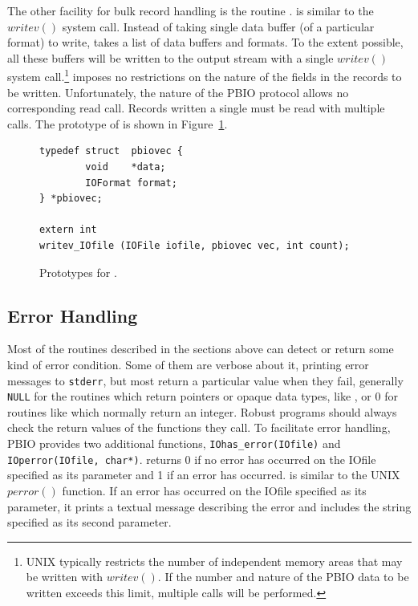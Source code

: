 The other facility for bulk record handling is the routine .
 is similar to the $writev()$ system call.  Instead of taking
single data buffer (of a particular format) to write,  takes
a list of data buffers and formats.  To the extent possible, all these buffers
will be written to the output stream with a single $writev()$ system
call.\footnote{UNIX typically restricts the number of independent memory areas
that may be written with $writev()$.  If the number and nature of the PBIO
data to be written exceeds this limit, multiple calls will be performed.}
 imposes no restrictions on the nature of the fields in the
records to be written.  Unfortunately, the nature of the PBIO protocol allows
no corresponding read call.  Records written a single  must
be read with multiple  calls.  The prototype of
 is shown in Figure~\ref{fig:writev}.
\begin{figure}[bth]
\begin{verbatim}
typedef struct  pbiovec {
        void    *data;
        IOFormat format;
} *pbiovec;

extern int
writev_IOfile (IOFile iofile, pbiovec vec, int count);
\end{verbatim}
\caption{Prototypes for .\label{fig:writev}}
\end{figure}

\subsection{Error Handling}
Most of the routines described in the sections above can detect or return some
kind of error condition.  Some of them are verbose about it, printing error
messages to {\tt stderr}, but most return a particular value when they fail,
generally {\tt NULL} for the routines which return pointers or opaque data
types, like , or $0$ for routines like
 which normally return an integer.  Robust programs should
always check the return values of the functions they call.  To facilitate
error handling, PBIO provides two additional functions, {\tt IOhas\_error(IOfile)}
and {\tt IOperror(IOfile, char*)}.   returns 0 if no error has
occurred on the IOfile specified as its parameter and 1 if an error has
occurred.   is similar to the UNIX $perror()$ function.  If an
error has occurred on the IOfile specified as its parameter, it prints a
textual message describing the error and includes the string specified as its
second parameter.

